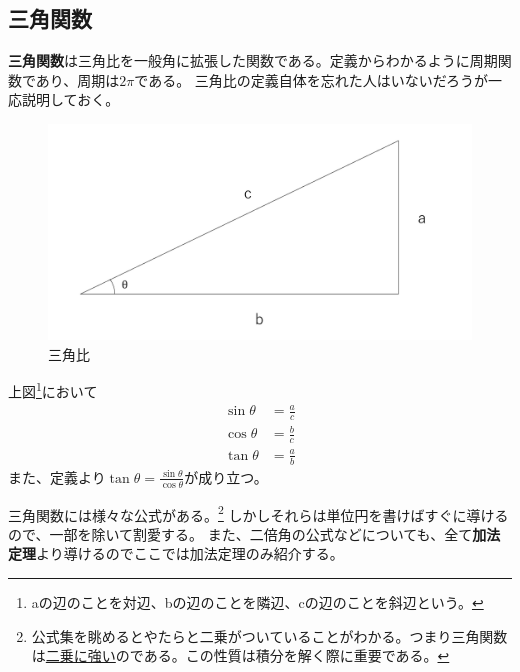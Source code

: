 \documentclass[a4j,dvipdfmx]{jsarticle}
\begin{document}
            \subsection{三角関数}
                \textbf{三角関数}は三角比を一般角に拡張した関数である。定義からわかるように周期関数であり、周期は$2\pi$である。
                三角比の定義自体を忘れた人はいないだろうが一応説明しておく。
                \begin{figure}[h]
                    \centering
                    \includegraphics[keepaspectratio,scale=0.3]{img/QuuNote/triangleFunc.png}
                    \caption{三角比}
                \end{figure}

                上図\footnote{aの辺のことを対辺、bの辺のことを隣辺、cの辺のことを斜辺という。}において
                \begin{align}
                    \sin \theta &= \frac{a}{c}\\
                    \cos \theta &= \frac{b}{c}\\
                    \tan \theta &= \frac{a}{b}
                \end{align}
                また、定義より$\displaystyle\tan \theta = \frac{\sin \theta}{\cos \theta}$が成り立つ。

                三角関数には様々な公式がある。\footnote{公式集を眺めるとやたらと二乗がついていることがわかる。つまり三角関数は\underline{二乗に強い}のである。この性質は積分を解く際に重要である。}
                しかしそれらは単位円を書けばすぐに導けるので、一部を除いて割愛する。
                また、二倍角の公式などについても、全て\textbf{加法定理}より導けるのでここでは加法定理のみ紹介する。
\end{document}
